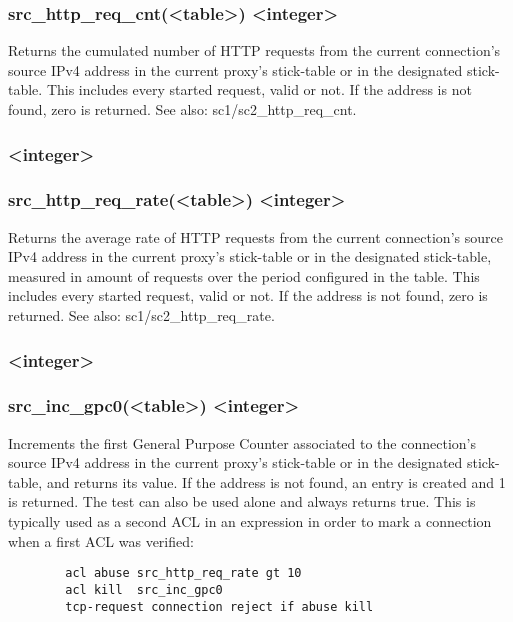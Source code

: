 \subsubsection*{src\_http\_req\_cnt(<table>) <integer>}
  Returns the cumulated number of HTTP requests from the current connection's
  source IPv4 address in the current proxy's stick-table or in the designated
  stick-table. This includes every started request, valid or not. If the
  address is not found, zero is returned. See also: sc1/sc2\_http\_req\_cnt.

\subsubsection[src\_http\_req\_rate]{ <integer>}
\subsubsection*{src\_http\_req\_rate(<table>) <integer>}
  Returns the average rate of HTTP requests from the current connection's
  source IPv4 address in the current proxy's stick-table or in the designated
  stick-table, measured in amount of requests over the period configured in the
  table. This includes every started request, valid or not. If the address is
  not found, zero is returned. See also: sc1/sc2\_http\_req\_rate.

\subsubsection[src\_inc\_gpc0]{ <integer>}
\subsubsection*{src\_inc\_gpc0(<table>) <integer>}
  Increments the first General Purpose Counter associated to the connection's
  source IPv4 address in the current proxy's stick-table or in the designated
  stick-table, and returns its value. If the address is not found, an entry is
  created and 1 is returned. The test can also be used alone and always returns
  true. This is typically used as a second ACL in an expression in order to
  mark a connection when a first ACL was verified:
  \begin{verbatim}
        acl abuse src_http_req_rate gt 10
        acl kill  src_inc_gpc0
        tcp-request connection reject if abuse kill
  \end{verbatim}

